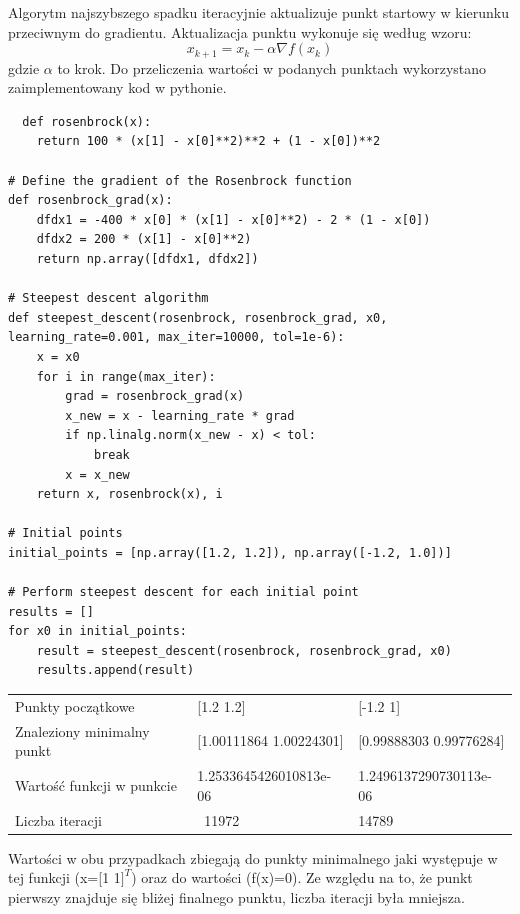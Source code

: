 \documentclass{article}
\begin{document}
Algorytm najszybszego spadku iteracyjnie aktualizuje punkt startowy w kierunku przeciwnym do gradientu. Aktualizacja punktu wykonuje się według wzoru:
\begin{equation}
  x_{k+1} = x_k - \alpha \nabla f(x_k)
\end{equation}
gdzie $\alpha$ to krok.
Do przeliczenia wartości w podanych punktach wykorzystano zaimplementowany kod w pythonie.
\begin{lstlisting}
  def rosenbrock(x):
    return 100 * (x[1] - x[0]**2)**2 + (1 - x[0])**2

# Define the gradient of the Rosenbrock function
def rosenbrock_grad(x):
    dfdx1 = -400 * x[0] * (x[1] - x[0]**2) - 2 * (1 - x[0])
    dfdx2 = 200 * (x[1] - x[0]**2)
    return np.array([dfdx1, dfdx2])

# Steepest descent algorithm
def steepest_descent(rosenbrock, rosenbrock_grad, x0, learning_rate=0.001, max_iter=10000, tol=1e-6):
    x = x0
    for i in range(max_iter):
        grad = rosenbrock_grad(x)
        x_new = x - learning_rate * grad
        if np.linalg.norm(x_new - x) < tol:
            break
        x = x_new
    return x, rosenbrock(x), i

# Initial points
initial_points = [np.array([1.2, 1.2]), np.array([-1.2, 1.0])]

# Perform steepest descent for each initial point
results = []
for x0 in initial_points:
    result = steepest_descent(rosenbrock, rosenbrock_grad, x0)
    results.append(result)
\end{lstlisting}
\begin{table}[h!]
  \begin{tabular}{lll}
  
  \multicolumn{1}{p{114.4275pt}}{\raggedright Punkty początkowe} & \multicolumn{1}{p{114.4275pt}}{\raggedright [1.2 1.2]} & \multicolumn{1}{p{113.67469pt}}{\raggedright [-1.2 1]}\\ 
  
  \multicolumn{1}{p{114.4275pt}}{\raggedright Znaleziony minimalny punkt} & \multicolumn{1}{p{114.4275pt}}{\raggedright [1.00111864 1.00224301]} & \multicolumn{1}{p{113.67469pt}}{\raggedright [0.99888303 0.99776284]}\\ 
  
  \multicolumn{1}{p{114.4275pt}}{\raggedright Wartość funkcji w punkcie} & \multicolumn{1}{p{114.4275pt}}{\raggedright 1.2533645426010813e-06} & \multicolumn{1}{p{113.67469pt}}{\raggedright 1.2496137290730113e-06}\\ 
  
  \multicolumn{1}{p{114.4275pt}}{\raggedright Liczba iteracji} & \multicolumn{1}{p{114.4275pt}}{\raggedright \ 11972} & \multicolumn{1}{p{113.67469pt}}{\raggedright 14789}\\ 
  
  
  \end{tabular}
  \end{table}
Wartości w obu przypadkach zbiegają do punkty minimalnego jaki występuje w tej funkcji (x=[1 1$]^T$) oraz do wartości (f(x)=0). Ze względu na to, że punkt pierwszy znajduje się bliżej finalnego punktu, liczba iteracji była mniejsza.
\end{document}
